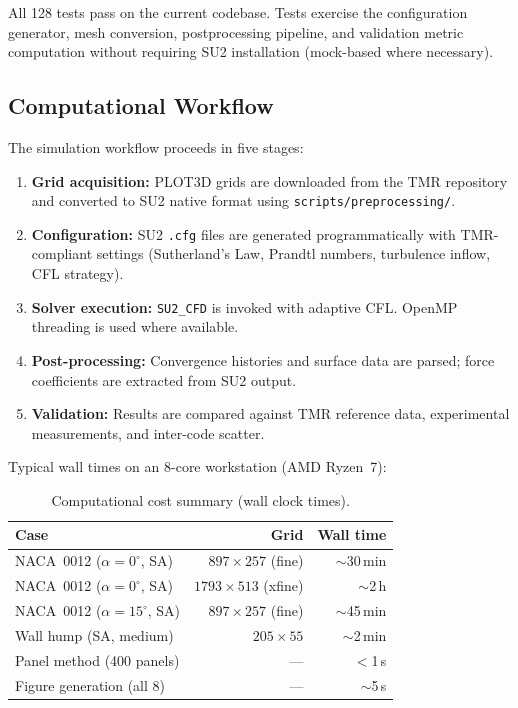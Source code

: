 \documentclass[11pt,a4paper]{article}
\begin{document}
All 128 tests pass on the current codebase.  Tests exercise the
configuration generator, mesh conversion, postprocessing pipeline,
and validation metric computation without requiring SU2 installation
(mock-based where necessary).

\subsection{Computational Workflow}

The simulation workflow proceeds in five stages:

\begin{enumerate}
  \item \textbf{Grid acquisition:} PLOT3D grids are downloaded from the
    TMR repository and converted to SU2 native format using
    \texttt{scripts/preprocessing/}.
  \item \textbf{Configuration:} SU2 \texttt{.cfg} files are generated
    programmatically with TMR-compliant settings (Sutherland's Law,
    Prandtl numbers, turbulence inflow, CFL strategy).
  \item \textbf{Solver execution:} \texttt{SU2\_CFD} is invoked with
    adaptive CFL.  OpenMP threading is used where available.
  \item \textbf{Post-processing:} Convergence histories and surface
    data are parsed; force coefficients are extracted from SU2 output.
  \item \textbf{Validation:} Results are compared against TMR reference
    data, experimental measurements, and inter-code scatter.
\end{enumerate}

Typical wall times on an 8-core workstation (AMD Ryzen~7):

\begin{table}[!ht]
\centering
\caption{Computational cost summary (wall clock times).}
\label{tab:cost}
\begin{tabular}{lrr}
\toprule
\textbf{Case} & \textbf{Grid} & \textbf{Wall time} \\
\midrule
NACA~0012 ($\alpha=0^\circ$, SA)  & $897\times257$ (fine)  & $\sim$30\,min \\
NACA~0012 ($\alpha=0^\circ$, SA)  & $1793\times513$ (xfine) & $\sim$2\,h \\
NACA~0012 ($\alpha=15^\circ$, SA) & $897\times257$ (fine)  & $\sim$45\,min \\
Wall hump (SA, medium)              & $205\times55$          & $\sim$2\,min \\
Panel method (400 panels)           & —                      & $<$1\,s \\
Figure generation (all 8)           & —                      & $\sim$5\,s \\
\bottomrule
\end{tabular}
\end{table}
\end{document}
